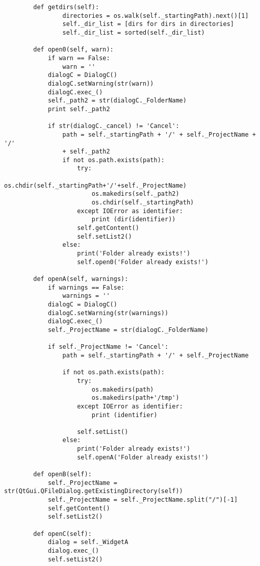\begin{verbatim}
        def getdirs(self):
                directories = os.walk(self._startingPath).next()[1]
                self._dir_list = [dirs for dirs in directories]
                self._dir_list = sorted(self._dir_list)
    
        def open0(self, warn):
            if warn == False:
                warn = ''
            dialogC = DialogC()
            dialogC.setWarning(str(warn))
            dialogC.exec_()
            self._path2 = str(dialogC._FolderName)
            print self._path2
    
            if str(dialogC._cancel) != 'Cancel':
                path = self._startingPath + '/' + self._ProjectName + '/' 
                + self._path2
                if not os.path.exists(path):
                    try:
                        os.chdir(self._startingPath+'/'+self._ProjectName)
                        os.makedirs(self._path2)
                        os.chdir(self._startingPath)
                    except IOError as identifier:
                        print (dir(identifier))
                    self.getContent()
                    self.setList2()
                else:
                    print('Folder already exists!')
                    self.open0('Folder already exists!')
    
        def openA(self, warnings):
            if warnings == False:
                warnings = ''
            dialogC = DialogC()
            dialogC.setWarning(str(warnings))
            dialogC.exec_()
            self._ProjectName = str(dialogC._FolderName)
    
            if self._ProjectName != 'Cancel':
                path = self._startingPath + '/' + self._ProjectName
   
                if not os.path.exists(path):
                    try:
                        os.makedirs(path)
                        os.makedirs(path+'/tmp')
                    except IOError as identifier:
                        print (identifier)
   
                    self.setList()
                else:
                    print('Folder already exists!')
                    self.openA('Folder already exists!')
    
        def openB(self):
            self._ProjectName = str(QtGui.QFileDialog.getExistingDirectory(self))
            self._ProjectName = self._ProjectName.split("/")[-1]
            self.getContent()
            self.setList2()
    
        def openC(self):
            dialog = self._WidgetA
            dialog.exec_()
            self.setList2()
    

\end{verbatim}
